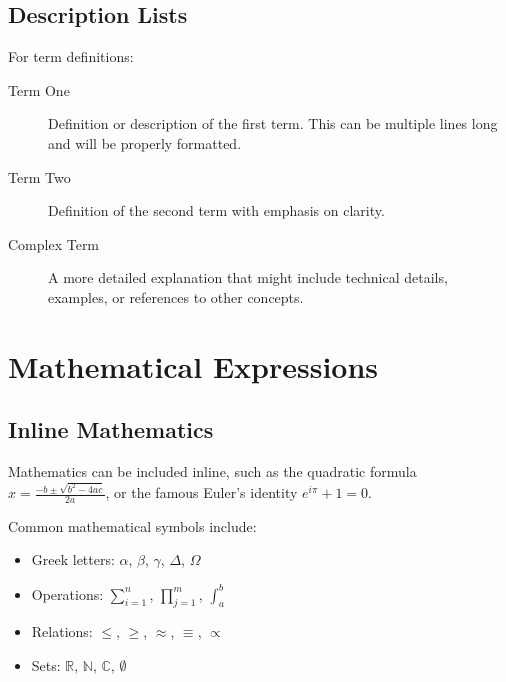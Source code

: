 \subsection*{Description Lists}
\label{subsec:description_lists}

For term definitions:

\begin{description}
	\item[Term One] Definition or description of the first term. This can be
		multiple lines long and will be properly formatted.
	\item[Term Two] Definition of the second term with emphasis on clarity.
	\item[Complex Term] A more detailed explanation that might include
		technical details, examples, or references to other concepts.
\end{description}

\section{Mathematical Expressions}
\label{sec:mathematics}

\subsection*{Inline Mathematics}
\label{subsec:inline_math}

Mathematics can be included inline, such as the quadratic formula
$x = \frac{-b \pm \sqrt{b^2 - 4ac}}{2a}$, or the famous Euler's identity
$e^{i\pi} + 1 = 0$.

Common mathematical symbols include:
\begin{itemize}
	\item Greek letters: $\alpha$, $\beta$, $\gamma$, $\Delta$, $\Omega$
	\item Operations: $\sum_{i=1}^{n}$, $\prod_{j=1}^{m}$, $\int_{a}^{b}$
	\item Relations: $\leq$, $\geq$, $\approx$, $\equiv$, $\propto$
	\item Sets: $\mathbb{R}$, $\mathbb{N}$, $\mathbb{C}$, $\emptyset$
\end{itemize}

